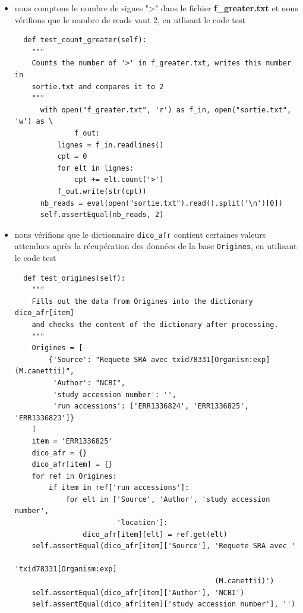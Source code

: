 \documentclass[twoside,a4paper,11pt,frenchb,openany]{report}
\begin{document}
\begin{itemize}
\begin{verbatim}
  def test_concat(self):
    """
    Applies concat() to the tests files f1.txt and f2.txt and check the
    content of f_shuffled.txt after processing.
    """
    concat("f1.txt", "f2.txt", "f_shuffled.txt")
    with open("f_shuffled.txt", 'r') as f:
        lignes = f.readlines()
    self.assertEqual(['ligne 1\n', 'ligne 2\n', 'ligne 3\n', 'ligne 4\n'],
                      lignes)
\end{verbatim}
\item nous comptons le nombre de signes ">" dans le fichier \textbf{f\_greater.txt} et nous vérifions que le nombre de reads vaut 2, en utlisant le code test
\begin{verbatim}
  def test_count_greater(self):
    """
    Counts the number of '>' in f_greater.txt, writes this number in 
    sortie.txt and compares it to 2 
    """
      with open("f_greater.txt", 'r') as f_in, open("sortie.txt", 'w') as \
              f_out:
          lignes = f_in.readlines()
          cpt = 0
          for elt in lignes:
              cpt += elt.count('>')
          f_out.write(str(cpt))
      nb_reads = eval(open("sortie.txt").read().split('\n')[0])
      self.assertEqual(nb_reads, 2)
\end{verbatim}
\item nous vérifions que le dictionnaire \texttt{dico\_afr} contient certaines valeurs attendues après la récupération des données de la base \texttt{Origines}, en utilisant le code test
\begin{verbatim}
  def test_origines(self):
    """
    Fills out the data from Origines into the dictionary dico_afr[item]
    and checks the content of the dictionary after processing.  
    """
    Origines = [
        {'Source': "Requete SRA avec txid78331[Organism:exp]  (M.canettii)",
         'Author': "NCBI",
         'study accession number': '',
         'run accessions': ['ERR1336824', 'ERR1336825', 'ERR1336823']}
    ]
    item = 'ERR1336825'
    dico_afr = {}
    dico_afr[item] = {}
    for ref in Origines:
        if item in ref['run accessions']:
            for elt in ['Source', 'Author', 'study accession number',
                        'location']:
                dico_afr[item][elt] = ref.get(elt)
    self.assertEqual(dico_afr[item]['Source'], 'Requete SRA avec '
                                               'txid78331[Organism:exp] 
                                               (M.canettii)')
    self.assertEqual(dico_afr[item]['Author'], 'NCBI')
    self.assertEqual(dico_afr[item]['study accession number'], '')

\end{verbatim}
\end{itemize}
\end{document}
